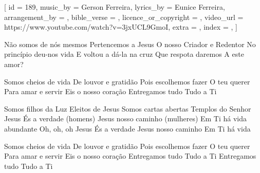 [
    id                     = {189},
    music_by               = {Gerson Ferreira},
    lyrics_by              = {Eunice Ferreira},
    arrangement_by         = {},
    bible_verse            = {},
    licence_or_copyright   = {},
    video_url              = {https://www.youtube.com/watch?v=3jxUCL9GmoI},
    extra                  = {},
    index                  = {},
]


\beginverse
Não somos de nós mesmos 
Pertencemos a Jesus
O nosso Criador e Redentor
No princípio deu-nos vida
E voltou a dá-la na cruz
Que respota daremos
A este amor?
\endverse


\beginchorus
Somos cheios de vida
De louvor e gratidão 
Pois escolhemos fazer 
O teu querer
Para amar e servir
Eis o nosso coração 
Entregamos tudo 
Tudo a Ti
\endchorus


\beginverse
Somos filhos da Luz
Eleitos de Jesus
Somos cartas abertas
Templos do Senhor
Jesus És a verdade (homens) 
Jesus nosso caminho (mulheres)
Em Ti há vida abundante
Oh, oh, oh
Jesus És a verdade
Jesus nosso caminho
Em Ti há vida 
\endverse


\beginchorus
Somos cheios de vida
De louvor e gratidão 
Pois escolhemos fazer 
O teu querer
Para amar e servir
Eis o nosso coração 
Entregamos tudo 
Tudo a Ti
Entregamos tudo 
Tudo a Ti
\endchorus

\endsong
